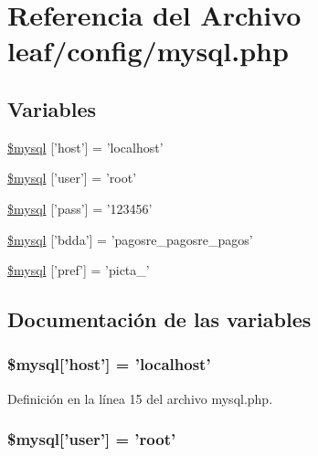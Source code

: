 \hypertarget{mysql_8php}{\section{Referencia del Archivo leaf/config/mysql.php}
\label{mysql_8php}
}
\subsection*{Variables}
\begin{DoxyCompactItemize}
\item 
\hyperlink{mysql_8php_afb4eac0a59446388a3fd59da8bbad466}{\$mysql} \mbox{[}'host'\mbox{]} = 'localhost'
\item 
\hyperlink{mysql_8php_acb51a6cbb3dc7b1ed799347ba609b79b}{\$mysql} \mbox{[}'user'\mbox{]} = 'root'
\item 
\hyperlink{mysql_8php_a29834c14ccc128006f5f4ff30417762a}{\$mysql} \mbox{[}'pass'\mbox{]} = '123456'
\item 
\hyperlink{mysql_8php_ad8cf4b12c73eaf96b253c794a223a506}{\$mysql} \mbox{[}'bdda'\mbox{]} = 'pagosre\-\_\-pagosre\-\_\-pagos'
\item 
\hyperlink{mysql_8php_a289b7ce8a1af0f5281112b43967b5e67}{\$mysql} \mbox{[}'pref'\mbox{]} = 'picta\-\_\-'
\end{DoxyCompactItemize}


\subsection{Documentación de las variables}
\hypertarget{mysql_8php_afb4eac0a59446388a3fd59da8bbad466}{
\subsubsection[{\$mysql}]{\setlength{\rightskip}{0pt plus 5cm}\${\bf mysql}\mbox{[}'host'\mbox{]} = 'localhost'}}\label{mysql_8php_afb4eac0a59446388a3fd59da8bbad466}


Definición en la línea 15 del archivo mysql.\-php.

\hypertarget{mysql_8php_acb51a6cbb3dc7b1ed799347ba609b79b}{
\subsubsection[{\$mysql}]{\setlength{\rightskip}{0pt plus 5cm}\${\bf mysql}\mbox{[}'user'\mbox{]} = 'root'}}\label{mysql_8php_acb51a6cbb3dc7b1ed799347ba609b79b}


